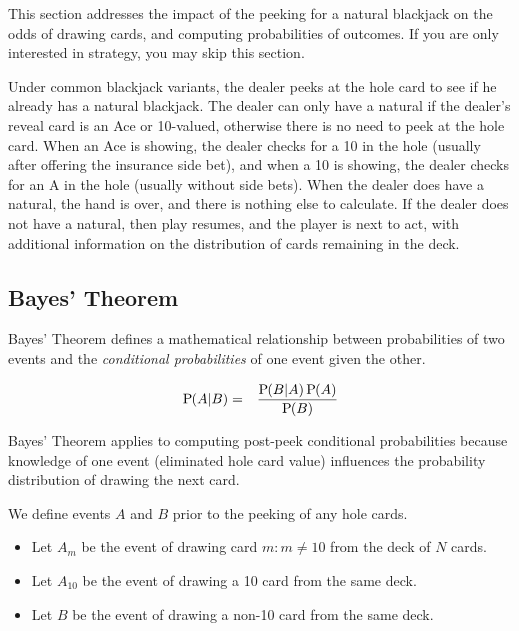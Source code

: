 This section addresses the impact of the peeking for a natural blackjack
on the odds of drawing cards, and computing probabilities of outcomes.
If you are only interested in strategy, you may skip this section.  

Under common blackjack variants, the dealer peeks at the hole card
to see if he already has a natural blackjack.
The dealer can only have a natural if the dealer's reveal card is an 
Ace or 10-valued, otherwise there is no need to peek at the hole card.
When an Ace is showing, the dealer checks for a 10 in the hole (usually 
after offering the insurance side bet), and when a 10 is showing, 
the dealer checks for an A in the hole (usually without side bets).
When the dealer does have a natural, the hand is over, 
and there is nothing else to calculate.
If the dealer does not have a natural, then play resumes, 
and the player is next to act, with additional information on the
distribution of cards remaining in the deck.

\subsection{Bayes' Theorem}
\label{sec:basic:peeking:bayes}

Bayes' Theorem defines a mathematical relationship between
probabilities of two events and the \emph{conditional probabilities}
of one event given the other.

\begin{eqnarray}
\textrm{P}\hspace{-.5ex}\left(A|B\right) &=& \frac{\textrm{P}\hspace{-.5ex}\left(B|A\right)\textrm{P}\hspace{-.5ex}\left(A\right)}{\textrm{P}\hspace{-.5ex}\left(B\right)} \label{eqn:bayes}
\end{eqnarray}

Bayes' Theorem applies to computing post-peek conditional probabilities
because knowledge of one event (eliminated hole card value)
influences the probability distribution of drawing the next card.

We define events $A$ and $B$ prior to the peeking of any hole cards.
\begin{itemize}
\item Let $A_m$ be the event of drawing card $m:m\neq{}10$ 
from the deck of $N$ cards.
\item Let $A_{10}$ be the event of drawing a 10 card from the same deck.
\item Let $B$ be the event of drawing a non-10 card from the same deck.
\end{itemize}

